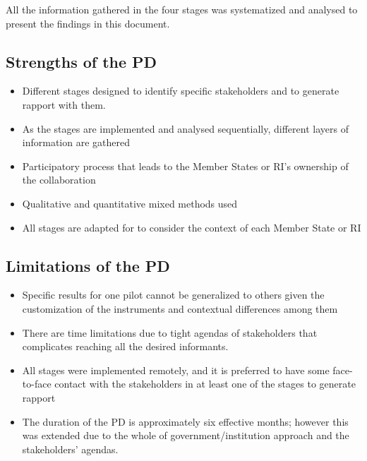 \documentclass[
  10pt,
]{book}
\begin{document}
All the information gathered in the four stages was systematized and analysed to present the findings in this document.

\hypertarget{strengths-of-the-pd}{%
\subsection*{Strengths of the PD}\label{strengths-of-the-pd}}

\begin{itemize}
\item
  Different stages designed to identify specific stakeholders and to generate rapport with them.
\item
  As the stages are implemented and analysed sequentially, different layers of information are gathered
\item
  Participatory process that leads to the Member States or RI's ownership of the collaboration
\item
  Qualitative and quantitative mixed methods used
\item
  All stages are adapted for to consider the context of each Member State or RI
\end{itemize}

\hypertarget{limitations-of-the-pd}{%
\subsection*{Limitations of the PD}\label{limitations-of-the-pd}}

\begin{itemize}
\item
  Specific results for one pilot cannot be generalized to others given the customization of the instruments and contextual differences among them
\item
  There are time limitations due to tight agendas of stakeholders that complicates reaching all the desired informants.
\item
  All stages were implemented remotely, and it is preferred to have some face-to-face contact with the stakeholders in at least one of the stages to generate rapport
\item
  The duration of the PD is approximately six effective months; however this was extended due to the whole of government/institution approach and the stakeholders' agendas.
\end{itemize}
\end{document}
